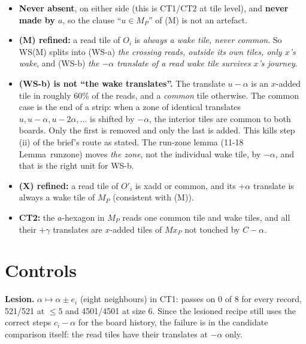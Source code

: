 \documentclass[11pt]{article}
\theoremstyle{definition}\newtheorem{definition}[theorem]{Definition}\newtheorem{remark}[theorem]{Remark}
\begin{document}
\begin{itemize}
\item \textbf{Never absent}, on either side (this is CT1/CT2 at tile level), and \textbf{never made by $a$}, so the clause ``$u\in M_P$'' of (M) is not an artefact.
\item \textbf{(M) refined:} a read tile of $O_i$ is \emph{always a wake tile, never common}. So WS(M) splits into (WS-a) \emph{the crossing reads, outside its own tiles, only $x$'s wake}, and (WS-b) \emph{the $-\alpha$ translate of a read wake tile survives $x$'s journey}.
\item \textbf{(WS-b) is not ``the wake translates''.} The translate $u-\alpha$ is an $x$-added tile in roughly 60\% of the reads, and a \emph{common} tile otherwise. The common case is the end of a strip: when a zone of identical translates $u,u-\alpha,u-2\alpha,\dots$ is shifted by $-\alpha$, the interior tiles are common to both boards. Only the first is removed and only the last is added.
This kills step (ii) of the brief's route as stated. The run-zone lemma (11-18 Lemma~runzone) moves \emph{the zone}, not the individual wake tile, by $-\alpha$, and that is the right unit for WS-b.
\item \textbf{(X) refined:} a read tile of $O'_i$ is xadd or common, and its $+\alpha$ translate is always a wake tile of $M_P$ (consistent with (M)).
\item \textbf{CT2:} the $a$-hexagon in $M_P$ reads one common tile and wake tiles, and all their $+\gamma$ translates are $x$-added tiles of $Mx_P$ not touched by $C-\alpha$.
\end{itemize}

\section{Controls}\label{sec:ctrl}
\textbf{Lesion.} $\alpha\mapsto\alpha\pm e_i$ (eight neighbours) in CT1: passes on 0 of 8 for every record, 521/521 at $\le5$ and 4501/4501 at size 6. Since the lesioned recipe still uses the correct steps $c_i-\alpha$ for the board history, the failure is in the candidate comparison itself: the read tiles have their translates at $-\alpha$ only.
\end{document}
